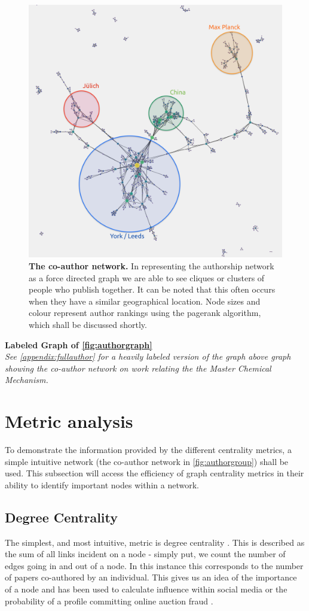 \begin{figure}[H]
     \centering
         \includegraphics[width=.8\textwidth]{figures_c3/GroupAuthor.png}
        \caption{ \textbf{The co-author network.} In representing the authorship network as a force directed graph we are able to see cliques or clusters of people who publish together. It can be noted that this often occurs when they have a similar geographical location. {Node sizes and colour represent author rankings using the pagerank algorithm, which shall be discussed shortly.}}
        \label{fig:authorgroup}
\end{figure}


\textbf{Labeled Graph of \autoref{fig:authorgraph}}\\
\textit{See \autoref{appendix:fullauthor} for a heavily labeled version of the graph above graph showing the co-author network on work relating the the Master Chemical Mechanism. }


\section{Metric analysis}\label{sec:graphcentrality}

To demonstrate the information provided by the different centrality metrics, a simple intuitive network (the co-author network in \autoref{fig:authorgroup}) shall be used. This subsection will access the efficiency of graph centrality metrics in their ability to identify important nodes within a network. 


\subsection{Degree Centrality}
The simplest, and most intuitive, metric is degree centrality \citep{degreefreeman}. This is described as the sum of all links incident on a node - simply put, we count the number of edges going in and out of a node. In this instance this corresponds to the number of papers co-authored by an individual. This gives us an idea of the importance of a node and has been used to calculate influence within social media or the probability of a profile committing online auction fraud \citep{degreetwitter,degreefreeman}.


